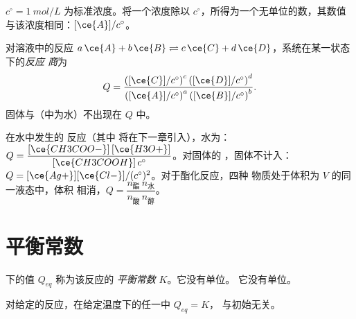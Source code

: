 \begin{notation}[标准浓度]\label{not:g12:equilibrium:c-standard}
$c^\circ = \qty{1}{mol/L}$ 为标准浓度。将一个浓度除以
$c^\circ$，所得为一个无单位的数，其数值
与该浓度相同：$[\ce{A}]/c^\circ$。
\end{notation}

\begin{definition}[反应商]\label{def:g12:equilibrium:quotient}
对溶液中的反应 $a\,\ce{A} + b\,\ce{B} \rightleftharpoons c\,\ce{C} + d\,\ce{D}$，系统在某一状态下的\emph{反应
商}为
\[
  Q = \frac{\left([\ce{C}]/c^\circ\right)^c \left([\ce{D}]/c^\circ\right)^d}
           {\left([\ce{A}]/c^\circ\right)^a \left([\ce{B}]/c^\circ\right)^b} .
\]
固体与（中为水）不出现在
$Q$ 中。
\end{definition}


\begin{example}[写出反应商]\label{ex:g12:equilibrium:quotients}
在水中发生的  反应（其中 
将在下一章引入），水为：
$Q = \dfrac{[\ce{CH3COO-}]\,[\ce{H3O+}]}{[\ce{CH3COOH}]\,c^\circ}$。对固体的
 ，固体不计入：
$Q = [\ce{Ag+}][\ce{Cl-}]/(c^\circ)^2$。对于酯化反应，四种
物质处于体积为 $V$ 的同一液态中，体积
相消，$Q = \dfrac{n_{\text{酯}}\, n_{\text{水}}}{n_{\text{酸}}\, n_{\text{醇}}}$。
\end{example}

\section{平衡常数}

\begin{definition}[平衡常数]\label{def:g12:equilibrium:constant}
下的值 $Q_{eq}$ 称为该反应的
\emph{平衡常数} $K$。它没有单位。
它没有单位。
\end{definition}

\begin{proposition}[$K$ 仅取决于温度]\label{prop:g12:equilibrium:constant}
对给定的反应，在给定温度下的任一中 $Q_{eq} = K$，
与初始无关。
\end{proposition}

